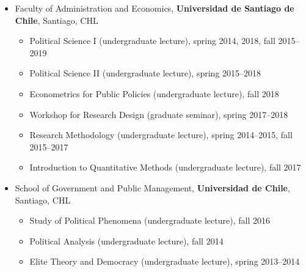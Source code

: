\begin{publications}
\begin{itemize}
\begin{itemize}
\item[$\circ$]{\small Comparative Government (undergraduate tutorial), Hilary 2020}
\end{itemize}
\item{\small Faculty of Administration and Economics, {\bfseries Universidad de Santiago de Chile}, Santiago, CHL}
\begin{itemize}
\item[$\circ$]{\small Political Science I (undergraduate lecture), spring 2014, 2018, fall 2015--2019}
\item[$\circ$]{\small Political Science II (undergraduate lecture), spring 2015--2018}
\item[$\circ$]{\small Econometrics for Public Policies (undergraduate lecture), fall 2018}
\item[$\circ$]{\small Workshop for Research Design (graduate seminar), spring 2017--2018}
\item[$\circ$]{\small Research Methodology (undergraduate lecture), spring 2014--2015, fall 2015--2017}
\item[$\circ$]{\small Introduction to Quantitative Methods (undergraduate lecture), fall 2017}
\end{itemize}
\item{\small School of Government and Public Management, {\bfseries Universidad de Chile}, Santiago, CHL}
\begin{itemize}
\item[$\circ$]{\small Study of Political Phenomena (undergraduate lecture), fall 2016}
\item[$\circ$]{\small Political Analysis (undergraduate lecture), fall 2014}
\item[$\circ$]{\small Elite Theory and Democracy (undergraduate lecture), spring 2013--2014}
\end{itemize}
\end{itemize}

\vspace{1mm}
\end{publications}
